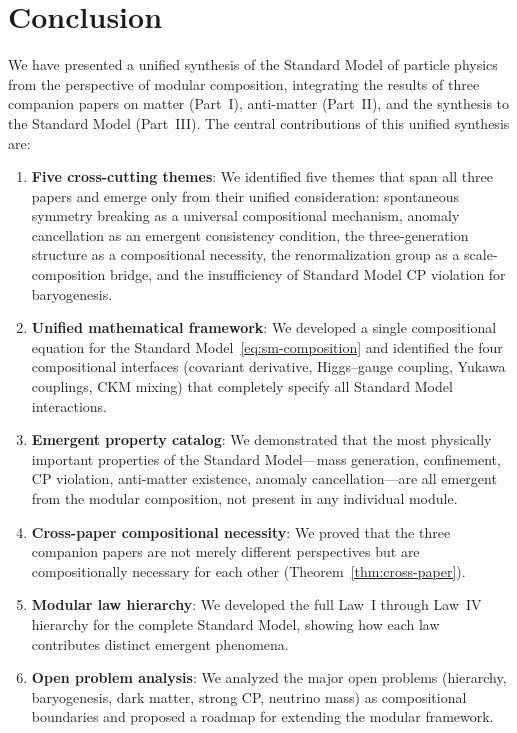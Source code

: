 \documentclass[12pt]{article}
\theoremstyle{definition}
\theoremstyle{remark}
\begin{document}
\section{Conclusion}
\label{sec:conclusion}

We have presented a unified synthesis of the Standard Model of particle physics from the perspective of modular composition, integrating the results of three companion papers on matter (Part~I), anti-matter (Part~II), and the synthesis to the Standard Model (Part~III). The central contributions of this unified synthesis are:

\begin{enumerate}
\item \textbf{Five cross-cutting themes}: We identified five themes that span all three papers and emerge only from their unified consideration: spontaneous symmetry breaking as a universal compositional mechanism, anomaly cancellation as an emergent consistency condition, the three-generation structure as a compositional necessity, the renormalization group as a scale-composition bridge, and the insufficiency of Standard Model CP violation for baryogenesis.

\item \textbf{Unified mathematical framework}: We developed a single compositional equation for the Standard Model~\eqref{eq:sm-composition} and identified the four compositional interfaces (covariant derivative, Higgs--gauge coupling, Yukawa couplings, CKM mixing) that completely specify all Standard Model interactions.

\item \textbf{Emergent property catalog}: We demonstrated that the most physically important properties of the Standard Model---mass generation, confinement, CP violation, anti-matter existence, anomaly cancellation---are all emergent from the modular composition, not present in any individual module.

\item \textbf{Cross-paper compositional necessity}: We proved that the three companion papers are not merely different perspectives but are compositionally necessary for each other (Theorem~\ref{thm:cross-paper}).

\item \textbf{Modular law hierarchy}: We developed the full Law~I through Law~IV hierarchy for the complete Standard Model, showing how each law contributes distinct emergent phenomena.

\item \textbf{Open problem analysis}: We analyzed the major open problems (hierarchy, baryogenesis, dark matter, strong CP, neutrino mass) as compositional boundaries and proposed a roadmap for extending the modular framework.
\end{enumerate}
\end{document}
